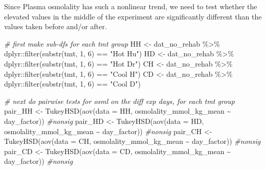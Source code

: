 \documentclass[
]{article}
\newenvironment{Shaded}{\begin{snugshade}}{\end{snugshade}}
\newcommand{\AttributeTok}[1]{\textcolor[rgb]{0.77,0.63,0.00}{#1}}
\newcommand{\CommentTok}[1]{\textcolor[rgb]{0.56,0.35,0.01}{\textit{#1}}}
\newcommand{\DecValTok}[1]{\textcolor[rgb]{0.00,0.00,0.81}{#1}}
\newcommand{\FunctionTok}[1]{\textcolor[rgb]{0.00,0.00,0.00}{#1}}
\newcommand{\NormalTok}[1]{#1}
\newcommand{\OtherTok}[1]{\textcolor[rgb]{0.56,0.35,0.01}{#1}}
\newcommand{\SpecialCharTok}[1]{\textcolor[rgb]{0.00,0.00,0.00}{#1}}
\newcommand{\StringTok}[1]{\textcolor[rgb]{0.31,0.60,0.02}{#1}}
\begin{document}
Since Plasma osmolality has such a nonlinear trend, we need to test
whether the elevated values in the middle of the experiment are
significantly different than the values taken before and/or after.

\begin{Shaded}
\begin{Highlighting}[]
\CommentTok{\# first make sub{-}dfs for each tmt group}
\NormalTok{HH }\OtherTok{\textless{}{-}}\NormalTok{ dat\_no\_rehab }\SpecialCharTok{\%\textgreater{}\%}
\NormalTok{  dplyr}\SpecialCharTok{::}\FunctionTok{filter}\NormalTok{(}\FunctionTok{substr}\NormalTok{(tmt, }\DecValTok{1}\NormalTok{, }\DecValTok{6}\NormalTok{) }\SpecialCharTok{==} \StringTok{"Hot Hu"}\NormalTok{)}
\NormalTok{HD }\OtherTok{\textless{}{-}}\NormalTok{ dat\_no\_rehab }\SpecialCharTok{\%\textgreater{}\%}
\NormalTok{  dplyr}\SpecialCharTok{::}\FunctionTok{filter}\NormalTok{(}\FunctionTok{substr}\NormalTok{(tmt, }\DecValTok{1}\NormalTok{, }\DecValTok{6}\NormalTok{) }\SpecialCharTok{==} \StringTok{"Hot Dr"}\NormalTok{)}
\NormalTok{CH }\OtherTok{\textless{}{-}}\NormalTok{ dat\_no\_rehab }\SpecialCharTok{\%\textgreater{}\%}
\NormalTok{  dplyr}\SpecialCharTok{::}\FunctionTok{filter}\NormalTok{(}\FunctionTok{substr}\NormalTok{(tmt, }\DecValTok{1}\NormalTok{, }\DecValTok{6}\NormalTok{) }\SpecialCharTok{==} \StringTok{"Cool H"}\NormalTok{)}
\NormalTok{CD }\OtherTok{\textless{}{-}}\NormalTok{ dat\_no\_rehab }\SpecialCharTok{\%\textgreater{}\%}
\NormalTok{  dplyr}\SpecialCharTok{::}\FunctionTok{filter}\NormalTok{(}\FunctionTok{substr}\NormalTok{(tmt, }\DecValTok{1}\NormalTok{, }\DecValTok{6}\NormalTok{) }\SpecialCharTok{==} \StringTok{"Cool D"}\NormalTok{)}

\CommentTok{\# next do pairwise tests for osml on the diff exp days, for each tmt group}
\NormalTok{pair\_HH }\OtherTok{\textless{}{-}} \FunctionTok{TukeyHSD}\NormalTok{(}\FunctionTok{aov}\NormalTok{(}\AttributeTok{data =}\NormalTok{ HH, osmolality\_mmol\_kg\_mean }\SpecialCharTok{\textasciitilde{}}\NormalTok{ day\_factor)) }\CommentTok{\#nonsig}
\NormalTok{pair\_HD }\OtherTok{\textless{}{-}} \FunctionTok{TukeyHSD}\NormalTok{(}\FunctionTok{aov}\NormalTok{(}\AttributeTok{data =}\NormalTok{ HD, osmolality\_mmol\_kg\_mean }\SpecialCharTok{\textasciitilde{}}\NormalTok{ day\_factor)) }\CommentTok{\#nonsig}
\NormalTok{pair\_CH }\OtherTok{\textless{}{-}} \FunctionTok{TukeyHSD}\NormalTok{(}\FunctionTok{aov}\NormalTok{(}\AttributeTok{data =}\NormalTok{ CH, osmolality\_mmol\_kg\_mean }\SpecialCharTok{\textasciitilde{}}\NormalTok{ day\_factor)) }\CommentTok{\#nonsig}
\NormalTok{pair\_CD }\OtherTok{\textless{}{-}} \FunctionTok{TukeyHSD}\NormalTok{(}\FunctionTok{aov}\NormalTok{(}\AttributeTok{data =}\NormalTok{ CD, osmolality\_mmol\_kg\_mean }\SpecialCharTok{\textasciitilde{}}\NormalTok{ day\_factor)) }\CommentTok{\#nonsig}


\end{Highlighting}
\end{Shaded}
\end{document}
